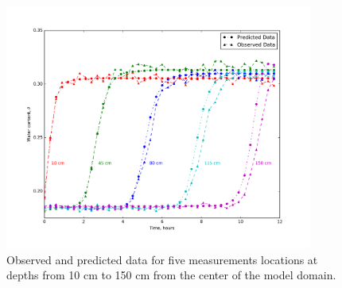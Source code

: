 \documentclass[preprint,review,3p,times,onecolumn,authoryear]{elsarticle}
\begin{document}
\begin{figure}[!htbp]
\begin{center}
\includegraphics[width=0.9\textwidth]{data.png}
\end{center}
\caption{Observed and predicted data for five measurements locations at depths from 10 cm to 150 cm from the center of the model domain.}
\label{fig:richards-data}
\end{figure}
\end{document}
